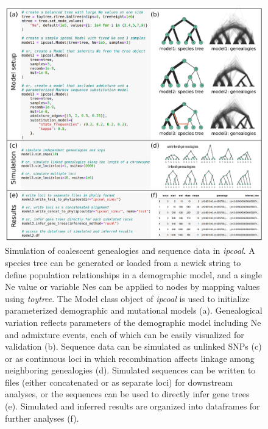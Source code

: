 \documentclass[11pt]{article}
\begin{document}
\begin{figure}
  \centering
  \includegraphics[width=15cm]{figures/composite.pdf}
  \caption{Simulation of coalescent genealogies and sequence data in \emph{ipcoal}. A species tree can be generated or loaded from a newick string to define population relationships in a demographic model, and a single Ne value or variable Nes can be applied to nodes by mapping values using \emph{toytree}. The Model class object of \emph{ipcoal} is used to initialize parameterized demographic and mutational models (a). Genealogical variation reflects parameters of the demographic model including Ne and admixture events, each of which can be easily visualized for validation (b). Sequence data can be simulated as unlinked SNPs (c) or as continuous loci in which recombination affects linkage among neighboring genealogies (d). Simulated sequences can be written to files (either concatenated or as separate loci) for downstream analyses, or the sequences can be used to directly infer gene trees (e). Simulated and inferred results are organized into dataframes for further analyses (f).
  }
  \label{fig:fig1}
\end{figure}



  
\end{document}
